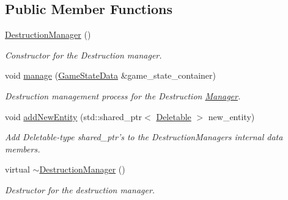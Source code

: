 \subsection*{Public Member Functions}
\begin{DoxyCompactItemize}
\item 
\hyperlink{class_destruction_manager_aec752aef0eb6b659293910c011e0fe93}{Destruction\+Manager} ()
\begin{DoxyCompactList}\small\item\em Constructor for the Destruction manager. \end{DoxyCompactList}\item 
\hypertarget{class_destruction_manager_acfb0e5bf3e2d24368918b4246a972394}{void \hyperlink{class_destruction_manager_acfb0e5bf3e2d24368918b4246a972394}{manage} (\hyperlink{class_game_state_data}{Game\+State\+Data} \&game\+\_\+state\+\_\+container)}\label{class_destruction_manager_acfb0e5bf3e2d24368918b4246a972394}

\begin{DoxyCompactList}\small\item\em Destruction management process for the Destruction \hyperlink{class_manager}{Manager}. \end{DoxyCompactList}\item 
\hypertarget{class_destruction_manager_a666b4ad3ae0c1383e4c9f53a48daf2ce}{void \hyperlink{class_destruction_manager_a666b4ad3ae0c1383e4c9f53a48daf2ce}{add\+New\+Entity} (std\+::shared\+\_\+ptr$<$ \hyperlink{class_deletable}{Deletable} $>$ new\+\_\+entity)}\label{class_destruction_manager_a666b4ad3ae0c1383e4c9f53a48daf2ce}

\begin{DoxyCompactList}\small\item\em Add Deletable-\/type shared\+\_\+ptr's to the Destruction\+Managers internal data members. \end{DoxyCompactList}\item 
\hypertarget{class_destruction_manager_a0c43cc0724e29a707e5a190c7f0d6761}{virtual \hyperlink{class_destruction_manager_a0c43cc0724e29a707e5a190c7f0d6761}{$\sim$\+Destruction\+Manager} ()}\label{class_destruction_manager_a0c43cc0724e29a707e5a190c7f0d6761}

\begin{DoxyCompactList}\small\item\em Destructor for the destruction manager. \end{DoxyCompactList}\end{DoxyCompactItemize}


